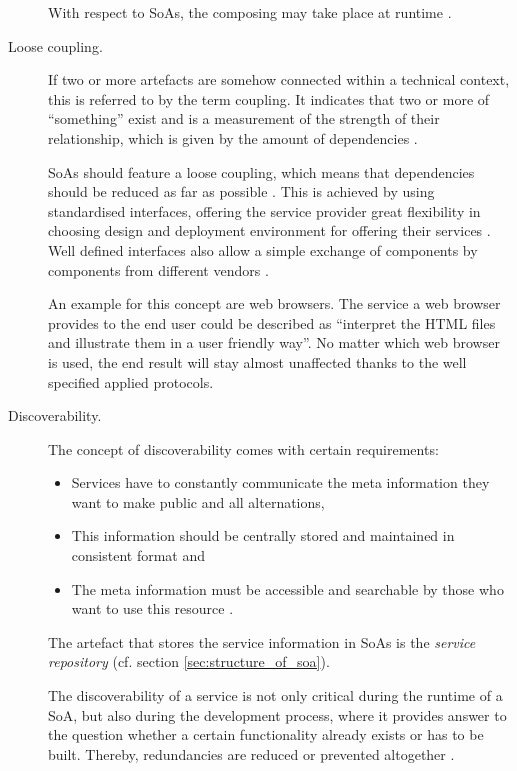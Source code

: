 \begin{description}
With respect to SoAs, the composing may take place at runtime \cite{breivold}.

\item [Loose coupling.]
If two or more artefacts are somehow connected within a technical context, this is referred to by the term coupling. It indicates that two or more of ``something'' exist and is a measurement of the strength of their relationship, which is given by the amount of dependencies \cite{erl2008}.

SoAs should feature a loose coupling, which means that dependencies should be reduced as far as possible \cite{erl2008}. This is achieved by using standardised interfaces, offering the service provider great flexibility in choosing design and deployment environment for offering their services \cite{breivold} \cite{arrowhead}. Well defined interfaces also allow a simple exchange of components by components from different vendors \cite{scholz}.

An example for this concept are web browsers. The service a web browser provides to the end user could be described as ``interpret the HTML files and illustrate them in a user friendly way''. No matter which web browser is used, the end result will stay almost unaffected thanks to the well specified applied protocols.

\item [Discoverability.] 
The concept of discoverability comes with certain requirements:
	\begin{itemize}
	\item Services have to constantly communicate the meta information they want to make public and all alternations,
	\item This information should be centrally stored and maintained in consistent format and
	\item The meta information must be accessible and searchable by those who want to use this resource \cite[ch.12.]{erl2008}.
	\end{itemize}
The artefact that stores the service information in SoAs is the \emph{service repository} (cf. section \ref{sec:structure_of_soa}).

The discoverability of a service is not only critical during the runtime of a SoA, but also during the development process, where it provides answer to the question whether a certain functionality already exists or has to be built. Thereby, redundancies are reduced or prevented altogether \cite[ch.12]{erl2008} \cite{arrowhead} \cite{breivold} \cite[p.27]{erl2011}.


\end{description}
